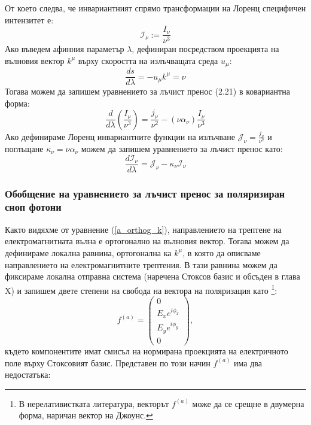 От което следва, че инвариантният спрямо трансформации на Лоренц специфичен интензитет е:
\begin{equation}
	\mathcal{I}_\nu := \frac{I_\nu}{\nu^3}
\end{equation}
Ако въведем афинния параметър $\lambda$, дефиниран посредством проекцията на вълновия вектор $k^\mu$ върху скоростта на излъчващата среда $u_\mu$:
\begin{equation}
	\frac{ds}{d\lambda} = -u_\mu k^\mu = \nu
\end{equation}
Тогава можем да запишем уравнението за лъчист пренос (2.21) в ковариантна форма:
\begin{equation}
	\frac{d}{d\lambda}\left(\frac{I_\nu}{\nu^3}\right) = \frac{j_\nu}{\nu^2} - (\nu\alpha_\nu)\frac{I_\nu}{\nu^3}
\end{equation}
Ако дефинираме Лоренц инвариантните функции на излъчване $\mathcal{J}_\nu = \frac{j_\nu}{\nu^2}$ и поглъщане $\kappa_\nu = \nu\alpha_\nu$ можем да запишем уравнението за лъчист пренос като:
\begin{equation}
	\frac{d\mathcal{I}_\nu}{d\lambda} = \mathcal{J}_\nu - \kappa_\nu\mathcal{I}_\nu
\end{equation}
\subsubsection{Обобщение на уравнението за лъчист пренос за поляризиран сноп фотони}

Както видяхме от уравнение (\ref{a_orthog_k}), направлението на трептене на електромагнитната вълна е ортогонално на вълновия вектор. Тогава можем да дефинираме локална равнина, ортогонална ка $k^\mu$, в която да описваме направлението на електромагнитните трептения. В тази равнина можем да фиксираме локална отправна система (наречена Стоксов базис и обсъден в глава {\color{red} X}) и запишем двете степени на свобода на вектора на поляризация като \footnote{В нерелативистката литература, векторът $f^{(a)}$ може да се срещне в двумерна форма, наричан вектор на Джоунс.}:
\begin{equation}
f^{(a)} = \begin{pmatrix}
			0 \\
			E_{x} e^{i\phi_{x}} \\
			E_{y} e^{i\phi_{y}} \\
			0
	\end{pmatrix},
\end{equation}
където компонентите имат смисъл на нормирана проекцията на електричното поле върху Стоксовият базис. Представен по този начин $f^{(a)}$ има два недостатъка:\\

